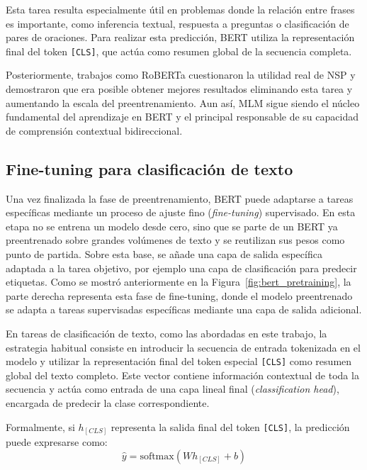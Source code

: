 Esta tarea resulta especialmente útil en problemas donde la relación entre frases es importante, como inferencia textual, respuesta a preguntas o clasificación de pares de oraciones. Para realizar esta predicción, \ac{BERT} utiliza la representación final del token \texttt{[CLS]}, que actúa como resumen global de la secuencia completa.

Posteriormente, trabajos como \ac{RoBERTa} cuestionaron la utilidad real de \ac{NSP} y demostraron que era posible obtener mejores resultados eliminando esta tarea y aumentando la escala del preentrenamiento. Aun así, \ac{MLM} sigue siendo el núcleo fundamental del aprendizaje en \ac{BERT} y el principal responsable de su capacidad de comprensión contextual bidireccional.

\subsection{Fine-tuning para clasificación de texto}
\label{subsec:fine_tuning_bert}

Una vez finalizada la fase de preentrenamiento, \ac{BERT} puede adaptarse a tareas específicas mediante un proceso de ajuste fino (\textit{fine-tuning}) supervisado. En esta etapa no se entrena un modelo desde cero, sino que se parte de un \ac{BERT} ya preentrenado sobre grandes volúmenes de texto y se reutilizan sus pesos como punto de partida. Sobre esta base, se añade una capa de salida específica adaptada a la tarea objetivo, por ejemplo una capa de clasificación para predecir etiquetas. Como se mostró anteriormente en la Figura~\ref{fig:bert_pretraining}, la parte derecha representa esta fase de fine-tuning, donde el modelo preentrenado se adapta a tareas supervisadas específicas mediante una capa de salida adicional.

En tareas de clasificación de texto, como las abordadas en este trabajo, la estrategia habitual consiste en introducir la secuencia de entrada tokenizada en el modelo y utilizar la representación final del token especial \texttt{[CLS]} como resumen global del texto completo. Este vector contiene información contextual de toda la secuencia y actúa como entrada de una capa lineal final (\textit{classification head}), encargada de predecir la clase correspondiente.

Formalmente, si \(h_{[CLS]}\) representa la salida final del token \texttt{[CLS]}, la predicción puede expresarse como:
\begin{equation*}
	\hat{y} = \text{softmax}(Wh_{[CLS]} + b)
\end{equation*}

